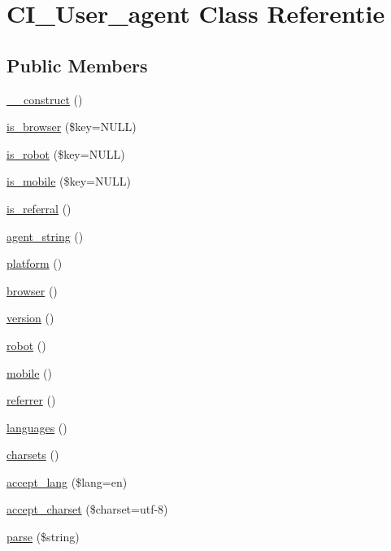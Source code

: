 \hypertarget{class_c_i___user__agent}{}\section{C\+I\+\_\+\+User\+\_\+agent Class Referentie}
\label{class_c_i___user__agent}
\subsection*{Public Members}
\begin{DoxyCompactItemize}
\item 
\mbox{\hyperlink{class_c_i___user__agent_a095c5d389db211932136b53f25f39685}{\+\_\+\+\_\+construct}} ()
\item 
\mbox{\hyperlink{class_c_i___user__agent_a3a0c84a9f4a781e53c7529af8a5075ae}{is\+\_\+browser}} (\$key=N\+U\+LL)
\item 
\mbox{\hyperlink{class_c_i___user__agent_aaf9eed8184635473476a24f6a850815c}{is\+\_\+robot}} (\$key=N\+U\+LL)
\item 
\mbox{\hyperlink{class_c_i___user__agent_ab0ec0b7f6a5eeaf00e35743c25e68dfe}{is\+\_\+mobile}} (\$key=N\+U\+LL)
\item 
\mbox{\hyperlink{class_c_i___user__agent_ab2ec679c069f45c4265dade1e1097f17}{is\+\_\+referral}} ()
\item 
\mbox{\hyperlink{class_c_i___user__agent_a2a75d1ec3cf3f59cdcae64f6afbc8a1b}{agent\+\_\+string}} ()
\item 
\mbox{\hyperlink{class_c_i___user__agent_ad69bddb2ba31b27415484b3da4213ba8}{platform}} ()
\item 
\mbox{\hyperlink{class_c_i___user__agent_a7dbfb19bfe0682921dcfad5de8dc987c}{browser}} ()
\item 
\mbox{\hyperlink{class_c_i___user__agent_a6080dae0886626b9a4cedb29240708b1}{version}} ()
\item 
\mbox{\hyperlink{class_c_i___user__agent_a4d6a9230d82ec6fc2fdd6bc57f4da5e5}{robot}} ()
\item 
\mbox{\hyperlink{class_c_i___user__agent_a8e13f70e084cbb413d7b68805f3b09dd}{mobile}} ()
\item 
\mbox{\hyperlink{class_c_i___user__agent_a3a7bdecfe4516d7ce790734ae1449d29}{referrer}} ()
\item 
\mbox{\hyperlink{class_c_i___user__agent_adda8fc15b6fe0efc05a50d2645189c77}{languages}} ()
\item 
\mbox{\hyperlink{class_c_i___user__agent_a1c3819a3fa2777b0b0f2c8ab5d97d833}{charsets}} ()
\item 
\mbox{\hyperlink{class_c_i___user__agent_a89add2e480d14b5f755993f4f5e0bd72}{accept\+\_\+lang}} (\$lang=\textquotesingle{}en\textquotesingle{})
\item 
\mbox{\hyperlink{class_c_i___user__agent_adc1f6218ec74ef1686ae6cb1218be7b1}{accept\+\_\+charset}} (\$charset=\textquotesingle{}utf-\/8\textquotesingle{})
\item 
\mbox{\hyperlink{class_c_i___user__agent_a8652be52c4455b8ce1a8e79fdb083703}{parse}} (\$string)
\end{DoxyCompactItemize}
